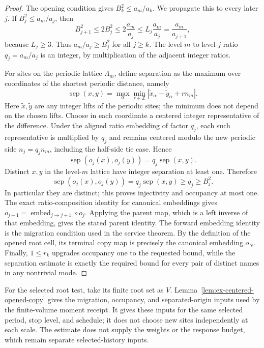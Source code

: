 \begin{proof}
The opening condition gives $B_k^2\leq a_m/a_k$. We propagate this to every later $j$. If $B_j^2\leq a_m/a_j$, then
\[
 B_{j+1}^2\leq2B_j^2\leq2\frac{a_m}{a_j}
 \leq L_j\frac{a_m}{a_j}=\frac{a_m}{a_{j+1}},
\]
because $L_j\geq3$. Thus $a_m/a_j\geq B_j^2$ for all $j\geq k$. The level-$m$ to level-$j$ ratio $q_j=a_m/a_j$ is an integer, by multiplication of the adjacent integer ratios.

For sites on the periodic lattice $\Lambda_m$, define separation as the maximum over coordinates of the shortest periodic distance, namely
\[
 \operatorname{sep}(x,y)=\max_\alpha\min_{r\in\mathbb Z}
      |\widetilde x_\alpha-\widetilde y_\alpha+r n_m|.
\]
Here $\widetilde x,\widetilde y$ are any integer lifts of the periodic sites; the minimum does not depend on the chosen lifts. Choose in each coordinate a centered integer representative of the difference. Under the aligned ratio embedding of factor $q_j$, each such representative is multiplied by $q_j$ and remains centered modulo the new periodic side $n_j=q_jn_m$, including the half-side tie case. Hence
\[
 \operatorname{sep}(o_j(x),o_j(y))=q_j\operatorname{sep}(x,y).
\]
Distinct $x,y$ in the level-$m$ lattice have integer separation at least one. Therefore
\[
 \operatorname{sep}(o_j(x),o_j(y))
 =q_j\operatorname{sep}(x,y)\geq q_j\geq B_j^2.
\]
In particular they are distinct; this proves injectivity and occupancy at most one. The exact ratio-composition identity for canonical embeddings gives $o_{j+1}=\operatorname{embed}_{j\to j+1}\circ o_j$. Applying the parent map, which is a left inverse of that embedding, gives the stated parent identity. The forward embedding identity is the migration condition used in the service theorem. By the definition of the opened root cell, its terminal copy map is precisely the canonical embedding $o_N$. Finally, $1\leq r_k$ upgrades occupancy one to the requested bound, while the separation estimate is exactly the required bound for every pair of distinct names in any nontrivial mode.
\end{proof}

For the selected root test, take its finite root set as $V$. Lemma~\ref{lem:ex-centered-opened-copy} gives the migration, occupancy, and separated-origin inputs used by the finite-volume moment receipt. It gives these inputs for the same selected period, stop level, and schedule; it does not choose new sites independently at each scale. The estimate does not supply the weights or the response budget, which remain separate selected-history inputs.
